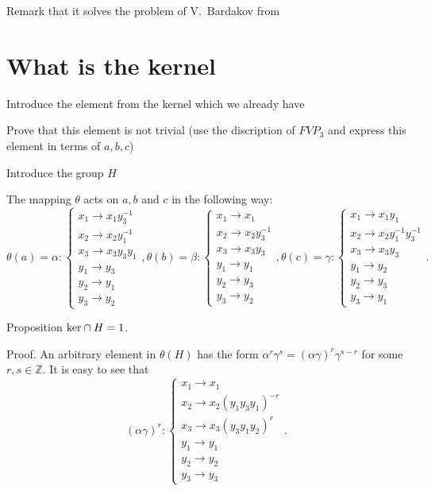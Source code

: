 \documentclass{article}
\begin{document}
Remark that it solves the problem of V.~Bardakov from \cite{problems}
\section{What is the kernel}
Introduce the element from the kernel which we already have

Prove that this element is not trivial (use the discription of $FVP_3$ and express this element in terms of $a,b,c$)

Introduce the group $H$

The mapping $\theta$ acts on $a, b$ and $c$ in the following way:
$$
\theta(a) = \alpha : 
\begin{cases}
	x_1 \rightarrow x_1 y_3^{-1}\\
	x_2 \rightarrow x_2 y_1^{-1}\\
	x_3 \rightarrow x_3 y_3 y_1\\
	y_1 \rightarrow y_3\\
	y_2 \rightarrow y_1\\
	y_3 \rightarrow y_2
\end{cases},
\theta(b) = \beta :
\begin{cases}
	x_1 \rightarrow x_1\\
	x_2 \rightarrow x_2 y_3^{-1}\\
	x_3 \rightarrow x_3 y_3\\
	y_1 \rightarrow y_1\\
	y_2 \rightarrow y_3\\
	y_3 \rightarrow y_2
\end{cases},
\theta(c) = \gamma :
\begin{cases}
	x_1 \rightarrow x_1 y_1\\
	x_2 \rightarrow x_2 y_1^{-1} y_3^{-1}\\
	x_3 \rightarrow x_3 y_3\\
	y_1 \rightarrow y_2\\
	y_2 \rightarrow y_3\\
	y_3 \rightarrow y_1
\end{cases}.
$$

Proposition ${\rm ker}\cap H=1$. 

Proof. An arbitrary element in $\theta(H)$ has the form $\alpha^r \gamma^s = (\alpha \gamma)^r \gamma^{s-r}$ for some $r,s \in \mathbb{Z}$. It is easy to see that
$$
(\alpha \gamma)^r :
\begin{cases}
	x_1 \rightarrow x_1\\
	x_2 \rightarrow x_2 (y_1 y_3 y_1)^{-r}\\
	x_3 \rightarrow x_3 (y_3 y_1 y_2)^r\\
	y_1 \rightarrow y_1\\
	y_2 \rightarrow y_2\\
	y_3 \rightarrow y_3
\end{cases}.
$$
\end{document}
